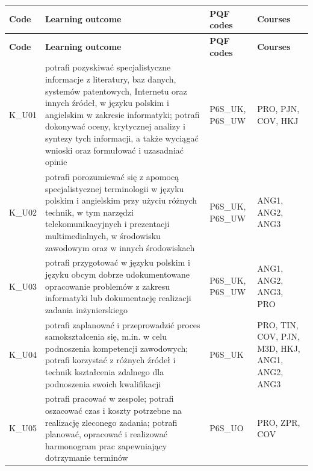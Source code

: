 \documentclass[12pt,a4paper]{article}
\newcommand{\thdrule}{\noalign{\global\setlength{\extrarowheight}{0pt}}}
\newcommand{\thdend}{\noalign{\global\setlength{\extrarowheight}{4pt}}}
\begin{document}
{\scriptsize
\begin{longtable}{m{1cm}m{8.8cm}m{2.1cm}m{2.5cm}}
\thdrule\toprule
\rowcolor{pjatkRed} {\color{white}\footnotesize\textbf{\vphantom{Ag}Code}} & {\color{white}\footnotesize\textbf{\vphantom{Ag}Learning outcome}} & {\color{white}\footnotesize\textbf{\vphantom{Ag}PQF codes}} & {\color{white}\footnotesize\textbf{\vphantom{Ag}Courses}} \\
\midrule\thdend
\endfirsthead
\thdrule\toprule
\rowcolor{pjatkRed} {\color{white}\footnotesize\textbf{\vphantom{Ag}Code}} & {\color{white}\footnotesize\textbf{\vphantom{Ag}Learning outcome}} & {\color{white}\footnotesize\textbf{\vphantom{Ag}PQF codes}} & {\color{white}\footnotesize\textbf{\vphantom{Ag}Courses}} \\
\midrule\thdend
\endhead
\rowcolor{tableRowLight} K\_U01 & potrafi pozyskiwać specjalistyczne informacje z literatury, baz danych, systemów patentowych, Internetu oraz innych źródeł, w języku polskim i angielskim w zakresie informatyki; potrafi dokonywać oceny, krytycznej analizy i syntezy tych informacji, a także wyciągać wnioski oraz formułować i uzasadniać opinie & {\scriptsize P6S\_UK, P6S\_UW} & {\scriptsize PRO, PJN, COV, HKJ} \\
\rowcolor{tableRowAlt} K\_U02 & potrafi porozumiewać się z apomocą specjalistycznej terminologii w języku polskim i angielskim przy użyciu różnych technik, w tym narzędzi telekomunikacyjnych i prezentacji multimedialnych, w środowisku zawodowym oraz w innych środowiskach & {\scriptsize P6S\_UK, P6S\_UW} & {\scriptsize ANG1, ANG2, ANG3} \\
\rowcolor{tableRowLight} K\_U03 & potrafi przygotować w języku polskim i języku obcym dobrze udokumentowane opracowanie problemów z zakresu informatyki lub dokumentację realizacji zadania inżynierskiego & {\scriptsize P6S\_UK, P6S\_UW} & {\scriptsize ANG1, ANG2, ANG3, PRO} \\
\rowcolor{tableRowAlt} K\_U04 & potrafi zaplanować i przeprowadzić proces samokształcenia się, m.in. w celu podnoszenia kompetencji zawodowych; potrafi korzystać z różnych źródeł i technik kształcenia zdalnego dla podnoszenia swoich kwalifikacji & {\scriptsize P6S\_UK} & {\scriptsize PRO, TIN, COV, PJN, M3D, HKJ, ANG1, ANG2, ANG3} \\
\rowcolor{tableRowLight} K\_U05 & potrafi pracować w zespole; potrafi oszacować czas i koszty potrzebne na realizację zleconego zadania; potrafi planować, opracować i realizować harmonogram prac zapewniający dotrzymanie terminów & {\scriptsize P6S\_UO} & {\scriptsize PRO, ZPR, COV} \\

\end{longtable}}
\end{document}
